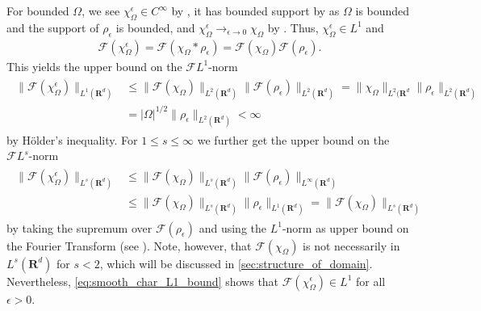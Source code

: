 \documentclass[a4paper]{article}
\newcommand{\rr}[1]{\mathbf{R}^{#1}}
\newcommand{\conv}[0]{*}
\newcommand{\norm}[2]{\|#1\|_{#2}}
\newcommand{\F}[0]{\mathscr{F}}
\newcommand{\FL}[1]{\F L^{#1}}
\newcommand{\chF}[1]{\chi_{#1}}
\newcommand{\chEF}[2]{\chF{#1}^{#2}}
\numberwithin{equation}{section}
\theoremstyle{remark}
\begin{document}
For bounded \(\Omega\), we see $\chi_{\Omega}^\epsilon\in C^\infty$
by \cite[Lemma 2.3]{Tartar07IntroductionSobolevSpaces},
it has bounded support by \cite[Equation (2.2)]{Tartar07IntroductionSobolevSpaces}
as \(\Omega\) is bounded and the support of \(\rho_\epsilon\) is bounded,
and $\chEF{\Omega}{\epsilon}\to_{\epsilon\to 0}\chF{\Omega}$ by \cite[Lemma 3.2]{Tartar07IntroductionSobolevSpaces}.
Thus, \(\chi_{\Omega}^\epsilon\in L^1\) and
\begin{align*}
    \mathscr{F}\left(\chi_{\Omega}^\epsilon\right)
    =\mathscr{F}\left(\chi_{\Omega}\conv\rho_\epsilon\right)
    =\mathscr{F}\left(\chi_{\Omega}\right)\mathscr{F}\left(\rho_\epsilon\right).
\end{align*}
This yields the upper bound on the $\FL{1}$-norm
\begin{align}
\label{eq:smooth_char_L1_bound}
\begin{split}
    \norm{\mathscr{F}\left(\chi_{\Omega}^\epsilon\right)}{L^1(\rr{d})}
    &\leq\norm{\mathscr{F}\left(\chF{\Omega}\right)}{L^2(\rr{d})}\norm{\mathscr{F}\left(\rho_\epsilon\right)}{L^2(\rr{d})}
    =\norm{\chF{\Omega}}{L^2(\rr{d}}\norm{\rho_\epsilon}{L^2(\rr{d})}\\
    &=|\Omega|^{1/2}\norm{\rho_\epsilon}{L^2(\rr{d})}<\infty
\end{split}
\end{align}
by Hölder's inequality.
For \(1\leq s\leq \infty\) we further get the upper bound on the $\FL{s}$-norm
\begin{align}
\label{eq:smooth_char_Lp_bound}
\begin{split}
    \norm{\mathscr{F}\left(\chi_{\Omega}^\epsilon\right)}{L^s(\rr{d})}
    &\leq\norm{\mathscr{F}\left(\chF{\Omega}\right)}{L^s(\rr{d})}\norm{\mathscr{F}\left(\rho_\epsilon\right)}{L^\infty(\rr{d})}\\
    &\leq \norm{\mathscr{F}\left(\chF{\Omega}\right)}{L^s(\rr{d})}\norm{\rho_\epsilon}{L^1(\rr{d})}
    =\norm{\mathscr{F}\left(\chF{\Omega}\right)}{L^s(\rr{d})}
\end{split}
\end{align}
by taking the supremum over \(\mathscr{F}\left(\rho_\epsilon\right)\) and using the $L^1$-norm as upper bound on the Fourier Transform
(see \cite[page 294]{Jones01LebesgueIntegrationEuclidean}).
Note, however, that \(\mathscr{F}\left(\chF{\Omega}\right)\) is not necessarily in \(L^s(\rr{d})\) for \(s<2\), which will be discussed in \cref{sec:structure_of_domain}.
Nevertheless, \cref{eq:smooth_char_L1_bound} shows that \(\mathscr{F}\left(\chi_{\Omega}^\epsilon\right)\in L^1\) for all \(\epsilon>0\).
\end{document}
